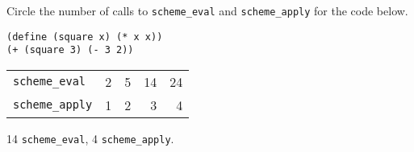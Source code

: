 \begin{blocksection}
\question Circle the number of calls to \lstinline$scheme_eval$ and
\lstinline$scheme_apply$ for the code below.

\begin{lstlisting}
(define (square x) (* x x))
(+ (square 3) (- 3 2))
\end{lstlisting}

\begin{tabular}{lrrrr}
\lstinline$scheme_eval$ & 2 & 5 & 14 & 24 \\
\lstinline$scheme_apply$ & 1 & 2 & 3 & 4
\end{tabular}

\begin{solution}
14 \lstinline$scheme_eval$, 4 \lstinline$scheme_apply$.
\end{solution}
\end{blocksection}
